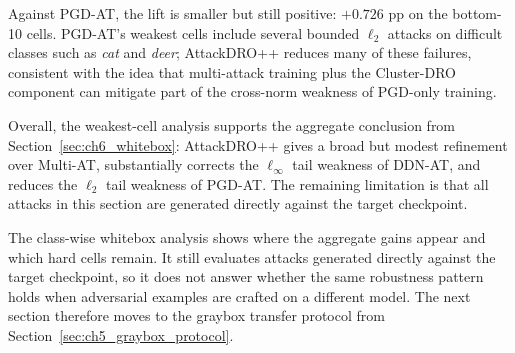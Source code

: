 Against PGD-AT, the lift is smaller but still positive: \(+0.726\) pp on the
bottom-10 cells. PGD-AT's weakest cells include several bounded \(\ell_2\)
attacks on difficult classes such as \textit{cat} and \textit{deer}; AttackDRO++
reduces many of these failures, consistent with the idea that multi-attack
training plus the Cluster-DRO component can mitigate part of the cross-norm
weakness of PGD-only training.

Overall, the weakest-cell analysis supports the aggregate conclusion from
Section~\ref{sec:ch6_whitebox}: AttackDRO++ gives a broad but modest refinement
over Multi-AT, substantially corrects the \(\ell_\infty\) tail weakness of
DDN-AT, and reduces the \(\ell_2\) tail weakness of PGD-AT. The remaining
limitation is that all attacks in this section are generated directly against
the target checkpoint.

The class-wise whitebox analysis shows where the aggregate gains appear and
which hard cells remain. It still evaluates attacks generated directly against
the target checkpoint, so it does not answer whether the same robustness pattern
holds when adversarial examples are crafted on a different model. The next
section therefore moves to the graybox transfer protocol from
Section~\ref{sec:ch5_graybox_protocol}.

